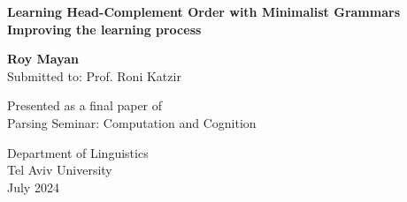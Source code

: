 \documentclass{article}
\begin{document}
	

\begin{titlepage}
    \begin{center}
	\vspace*{2cm}
        	\huge
        	\textbf{Learning Head-Complement Order with Minimalist Grammars \newline \\ Improving the learning process}


            
        	\vspace{2cm}
        	\LARGE
        	\textbf{Roy Mayan}\\
       	Submitted to: Prof. Roni Katzir 
            
        	\vfill
          
	Presented as a final paper of\\
	Parsing Seminar: Computation and Cognition
            
        	\vspace{0.8cm}
            
        	\Large
       	Department of Linguistics\\
       	Tel Aviv University\\
        	July 2024
    \end{center}
\end{titlepage}

\end{document}
